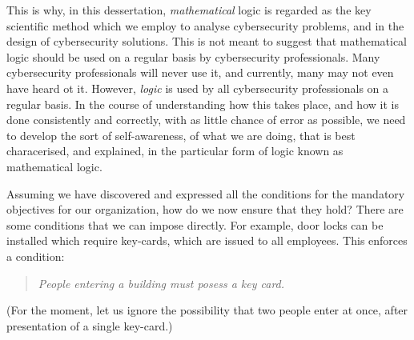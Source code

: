 This is why, in this dessertation, {\em mathematical} logic is regarded as the key scientific method which we employ to analyse cybersecurity problems, and in the design of cybersecurity solutions.
\if
This is not meant to suggest that mathematical logic should be used on a regular basis by cybersecurity professionals. Many cybersecurity professionals will never use it, and currently, many may not even have heard ot it. However, {\em logic} is used by all cybersecurity professionals on a regular basis. In the course of understanding how this takes place, and how it is done consistently and correctly, with as little chance of error as possible, we need to develop the sort of self-awareness, of what we are doing, that is best characerised, and explained, in the particular form of logic known as mathematical logic.

\fi



Assuming we have discovered and expressed all the conditions for the mandatory objectives for our organization, how do we now ensure that they hold? There are some conditions that we can impose directly. For example, door locks can be installed which require key-cards, which are issued to all employees. This enforces a condition: 
\begin{quote}\em
People entering a building must posess a key card.
\end{quote}
(For the moment, let us ignore the possibility that two people enter at once, after presentation of a single key-card.)

